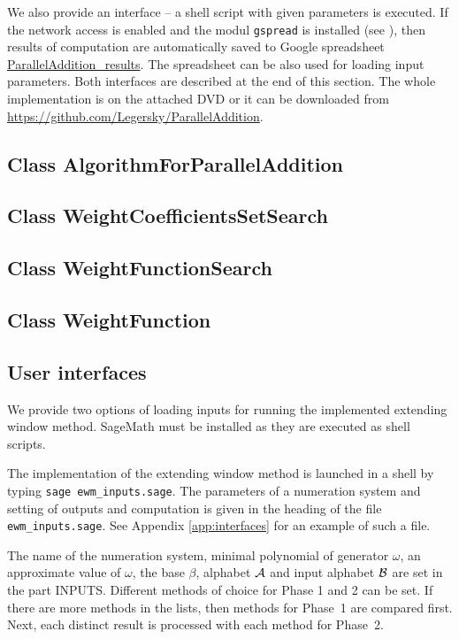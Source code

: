 We also provide an interface -- a shell script with given parameters is executed. If the network access is enabled and the modul \verb+gspread+ is installed (see \cite{gspread}), then results of computation are automatically saved to Google spreadsheet \href{https://docs.google.com/spreadsheets/d/1TnhrHdefHfHa0WSeVs4q6XVj3epjPlPlnoekE0E1xeM/edit?usp=sharing}{ParallelAddition\_results}. The spreadsheet can be also used for loading input parameters. Both interfaces are described at the end of this section. The whole implementation is on the attached DVD or it can be downloaded from  \url{https://github.com/Legersky/ParallelAddition}.



\subsection*{Class AlgorithmForParallelAddition}



\subsection*{Class WeightCoefficientsSetSearch}



\subsection*{Class WeightFunctionSearch}



\subsection*{Class WeightFunction}



\subsection*{User interfaces}
We provide two options of loading inputs for running the implemented extending window method. SageMath must be installed as they are executed as shell scripts.

The implementation of the extending window method is launched in a shell by typing \verb+sage ewm_inputs.sage+. The parameters of a numeration system and setting of outputs and computation is given in the heading of the file \verb+ewm_inputs.sage+. See Appendix \ref{app:interfaces} for an example of such a file.


The name of the numeration system, minimal polynomial of generator $\omega$, an approximate value of $\omega$, the base $\beta$, alphabet $\mathcal{A}$ and input alphabet $\mathcal{B}$ are set in the part INPUTS. Different methods of choice for Phase 1 and 2 can be set. If there are more methods in the lists, then methods for Phase~1 are compared first. Next, each distinct result is processed with each method for Phase~2.  

